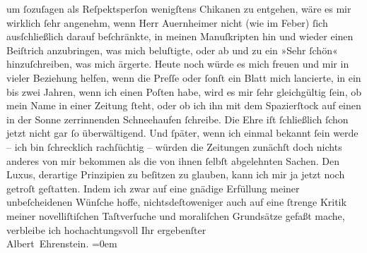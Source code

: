 \begin{ledgroupsized}[t]{13cm}
                    um ſozuſagen als Reſpektsperſon wenigſtens Chikanen zu entgehen, wäre es mir
                    wirklich ſehr angenehm, wenn Herr Auernheimer nicht (wie im Feber) ſich ausſchließlich
                    darauf beſchränkte, in meinen Manuſkripten hin und wieder einen Beiſtrich
                    anzubringen, was mich beluſtigte, oder ab und zu ein »Sehr ſchön«
                    hinzuſchreiben, was mich ärgerte. Heute noch würde es mich freuen und mir in
                    vieler Beziehung helfen, wenn die Preſſe oder
                    ſonſt ein Blatt mich lancierte, in ein bis zwei Jahren, wenn ich einen Poſten
                    habe, wird es mir ſehr gleichgültig ſein, ob mein Name in einer Zeitung ſteht,
                    oder ob ich ihn mit dem Spazierſtock auf einen in der Sonne zerrinnenden
                    Schneehaufen ſchreibe. {\pb}Die Ehre iſt
                    ſchließlich ſchon jetzt nicht gar ſo überwältigend. Und ſpäter, wenn ich einmal
                    bekannt ſein werde – ich bin ſchrecklich rachſüchtig – würden die Zeitungen
                    zunächſt doch nichts anderes von mir bekommen als die von ihnen ſelbſt
                    abgelehnten Sachen. Den Luxus, derartige Prinzipien \introOben{}zu\introOben{}
                    beſitzen zu glauben, kann ich mir ja jetzt noch getroſt geſtatten.\pend
           \pstart
           Indem ich zwar auf eine gnädige Erfüllung meiner \introOben{}unbeſcheidenen\introOben{} Wünſche hoffe, nichtsdeſtoweniger auch auf eine
                    ſtrenge Kritik meiner novelliſtiſchen Taſtverſuche und moraliſchen Grundsätze
                    gefaßt mache, verbleibe ich hochachtungsvoll\pend
           \pstart
           Ihr ergebenſter{\\[\baselineskip]}\spacefill\mbox{Albert Ehrenstein.}\pend
           \leftskip=0em{}
         
         \endnumbering{}\end{ledgroupsized}  \newcommand{\dateiname}{L01857}\newcommand{\titel}{Albert Ehrenstein an Arthur Schnitzler, 13. 7. 1909}\newcommand{\editorInnen}{Martin Anton Müller und Gerd-Hermann Susen}
      